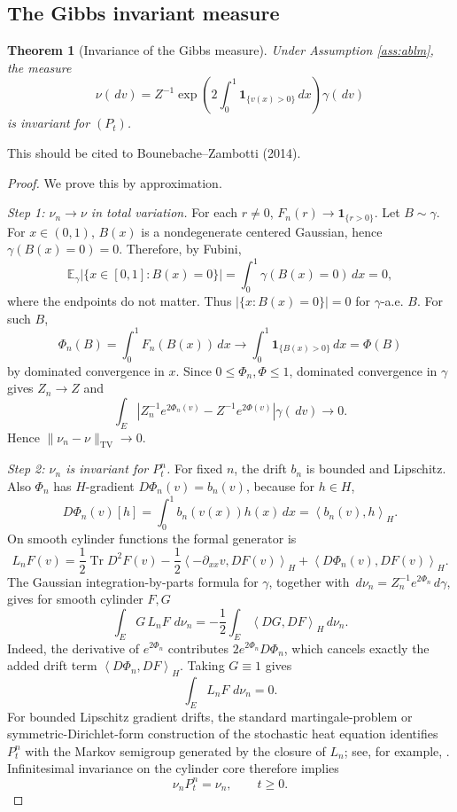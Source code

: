 \documentclass[12pt]{article}
\newcommand{\E}{\mathbb E}
\newcommand{\1}{\mathbf 1}
\newcommand{\dd}{\,d}
\newcommand{\TV}{\mathrm{TV}}
\newcommand{\ip}[2]{\left\langle #1,#2\right\rangle}
\theoremstyle{plain}
\newtheorem{theorem}{Theorem}[section]
\theoremstyle{definition}
\theoremstyle{remark}
\numberwithin{equation}{section}
\newcommand{\review}[1]{\begin{reviewbox}#1\end{reviewbox}}
\begin{document}
\subsection{The Gibbs invariant measure}

\begin{theorem}[Invariance of the Gibbs measure]\label{thm:invariance}
Under Assumption \ref{ass:ablm}, the measure
\[
\nu(\dd v)
=
Z^{-1}\exp\!\left(2\int_0^1\1_{\{v(x)>0\}}\dd x\right)\gamma(\dd v)
\]
is invariant for \((P_t)\).
\end{theorem}
\review{This should be cited to Bounebache--Zambotti (2014).}

\begin{proof}
We prove this by approximation.

\emph{Step 1: \(\nu_n\to\nu\) in total variation.}
For each \(r\ne0\), \(F_n(r)\to\1_{\{r>0\}}\).  Let \(B\sim\gamma\).  For
\(x\in(0,1)\), \(B(x)\) is a nondegenerate centered Gaussian, hence
\(\gamma(B(x)=0)=0\).  Therefore, by Fubini,
\[
\E_\gamma\bigl|\{x\in[0,1]:B(x)=0\}\bigr|
=\int_0^1\gamma(B(x)=0)\dd x=0,
\]
where the endpoints do not matter.  Thus \(|\{x:B(x)=0\}|=0\) for
\(\gamma\)-a.e. \(B\).  For such \(B\),
\[
\Phi_n(B)=\int_0^1F_n(B(x))\dd x
\longrightarrow
\int_0^1\1_{\{B(x)>0\}}\dd x=\Phi(B)
\]
by dominated convergence in \(x\).  Since \(0\le\Phi_n,\Phi\le1\), dominated
convergence in \(\gamma\) gives \(Z_n\to Z\) and
\[
\int_E\left|
Z_n^{-1}e^{2\Phi_n(v)}-Z^{-1}e^{2\Phi(v)}
\right|\gamma(\dd v)\longrightarrow0.
\]
Hence \(\|\nu_n-\nu\|_{\TV}\to0\).

\emph{Step 2: \(\nu_n\) is invariant for \(P_t^n\).}
For fixed \(n\), the drift \(b_n\) is bounded and Lipschitz.  Also
\(\Phi_n\) has \(H\)-gradient \(D\Phi_n(v)=b_n(v)\), because for
\(h\in H\),
\[
D\Phi_n(v)[h]=\int_0^1b_n(v(x))h(x)\dd x=\ip{b_n(v)}{h}_H.
\]
On smooth cylinder functions the formal generator is
\[
L_nF(v)=\frac12\operatorname{Tr}D^2F(v)
-\frac12\ip{-\partial_{xx}v}{DF(v)}_H
+\ip{D\Phi_n(v)}{DF(v)}_H.
\]
The Gaussian integration-by-parts formula for \(\gamma\), together with
\(\dd\nu_n=Z_n^{-1}e^{2\Phi_n}\dd\gamma\), gives for smooth cylinder \(F,G\)
\[
\int_EG\,L_nF\,\dd\nu_n
=
-\frac12\int_E\ip{DG}{DF}_H\dd\nu_n.
\]
Indeed, the derivative of \(e^{2\Phi_n}\) contributes
\(2e^{2\Phi_n}D\Phi_n\), which cancels exactly the added drift term
\(\ip{D\Phi_n}{DF}_H\).  Taking \(G\equiv1\) gives
\[
\int_EL_nF\,\dd\nu_n=0.
\]
For bounded Lipschitz gradient drifts, the standard martingale-problem or
symmetric-Dirichlet-form construction of the stochastic heat equation identifies
\(P_t^n\) with the Markov semigroup generated by the closure of \(L_n\); see,
for example, \cite{DPZ14,MR92}.  Infinitesimal invariance on the cylinder core
therefore implies
\[
\nu_nP_t^n=\nu_n,\qquad t\ge0.
\]


\end{proof}
\end{document}
